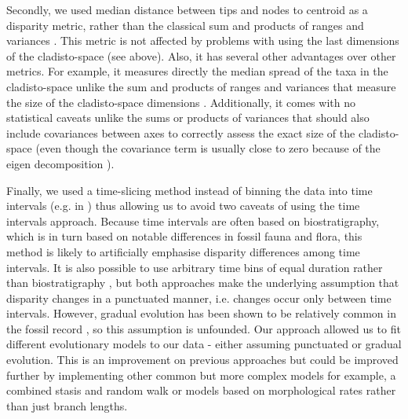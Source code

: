 \documentclass[10pt,letterpaper]{article}
\begin{document}
Secondly, we used median distance between tips and nodes to centroid as a disparity metric, rather than the classical sum and products of ranges and variances \cite{Wills1994}.
This metric is not affected by problems with using the last dimensions of the cladisto-space (see above).
Also, it has several other advantages over other metrics.
For example, it measures directly the median spread of the taxa in the cladisto-space unlike the sum and products of ranges and variances that measure the size of the cladisto-space dimensions \cite{Wills1994}.
Additionally, it comes with no statistical caveats unlike the sums or products of variances that should also include covariances between axes to correctly assess the exact size of the cladisto-space (even though the covariance term is usually close to zero because of the eigen decomposition \cite{GOWER01121966}).

Finally, we used a time-slicing method instead of binning the data into time intervals (e.g. in \cite{cisneros2010,prentice2011,Hughes20082013,hopkinsdecoupling2013,bentonmodels2014,bensonfaunal2014}) thus allowing us to avoid two caveats of using the time intervals approach.
Because time intervals are often based on biostratigraphy, which is in turn based on notable differences in fossil fauna and flora, this method is likely to artificially emphasise disparity differences among time intervals.
It is also possible to use arbitrary time bins of equal duration rather than biostratigraphy \cite{Butler2012,hopkinsdecoupling2013,bensonfaunal2014}, but both approaches make the underlying assumption that disparity changes in a punctuated  manner, i.e. changes occur only between time intervals.
However, gradual evolution has been shown to be relatively common in the fossil record \cite{Hunt20112007,Hunt21042015}, so this assumption is unfounded.
Our approach allowed us to fit different evolutionary models to our data - either assuming punctuated or gradual evolution.
This is an improvement on previous approaches but could be improved further by implementing other common but more complex models for example, a combined stasis and random walk \cite{Hunt21042015} or models based on morphological rates rather than just branch lengths.

\end{document}
